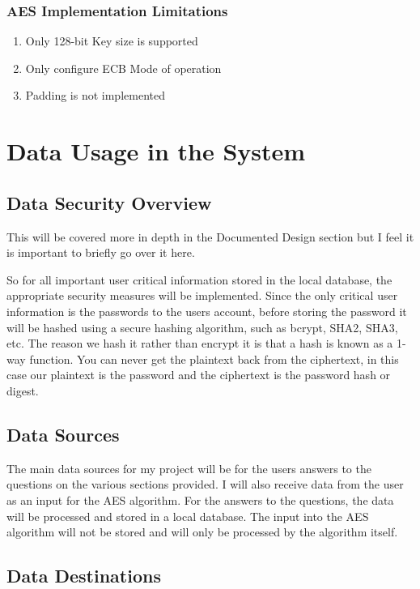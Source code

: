 \subsubsection{AES Implementation Limitations}
\begin{enumerate}
\item{Only 128-bit Key size is supported}
\item{Only configure ECB Mode of operation}
\item{Padding is not implemented}
\end{enumerate}

\section{Data Usage in the System}

\subsection{Data Security Overview}
This will be covered more in depth in the Documented Design section but I feel it is important to briefly go over it here.

So for all important user critical information stored in the local database, the appropriate security measures will be implemented. Since the only critical user information is the passwords to the users account, before storing the password it will be hashed using a secure hashing algorithm, such as bcrypt, SHA2, SHA3, etc. The reason we hash it rather than encrypt it is that a hash is known as a 1-way function. You can never get the plaintext back from the ciphertext, in this case our plaintext is the password and the ciphertext is the password hash or digest. 

\subsection{Data Sources}

The main data sources for my project will be for the users answers to the questions on the various sections provided. I will also receive data from the user as an input for the AES algorithm. For the answers to the questions, the data will be processed and stored in a local database. The input into the AES algorithm will not be stored and will only be processed by the algorithm itself. 

\subsection{Data Destinations}

